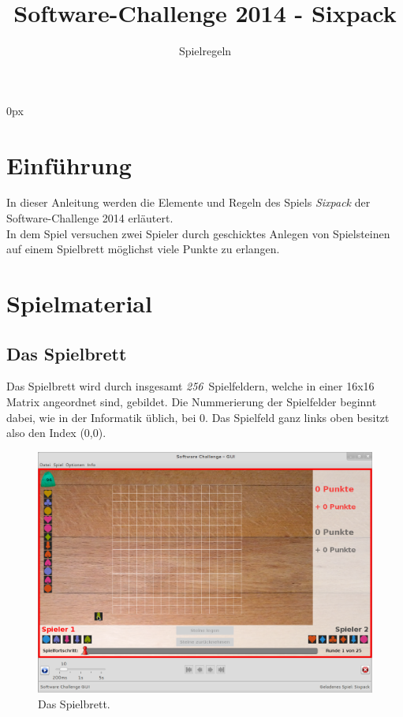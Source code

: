 \documentclass[a4paper, ngerman]{scrartcl}
\title{Software-Challenge 2014 - Sixpack}
\subtitle{Spielregeln}
\newcommand{\SpielFelderAnzahl}{\emph{256}}
\begin{document}
\parindent0px
\maketitle

\begin{figure}[h]
	\centering
\end{figure}
\vspace*{\fill}

\newpage
\tableofcontents
\newpage

\section{Einführung}
In dieser Anleitung werden die Elemente und Regeln des Spiels \emph{Sixpack}
der Software-Challenge 2014 erläutert.\\
In dem Spiel versuchen zwei Spieler durch geschicktes Anlegen von Spielsteinen auf einem Spielbrett möglichst viele Punkte zu erlangen.

\section{Spielmaterial}
	\subsection{Das Spielbrett}
Das Spielbrett wird durch insgesamt \SpielFelderAnzahl\ Spielfeldern, welche in einer 16x16 Matrix angeordnet sind, gebildet. Die Nummerierung der Spielfelder beginnt dabei, wie in der Informatik üblich, bei 0. Das Spielfeld ganz links oben besitzt also den Index (0,0).\\

\begin{figure}[h] \centering 
	\includegraphics[scale = 0.3]{images/Spielbrett}
	\caption{Das Spielbrett.}
	\label{fig:Spielfeld}
\end{figure}
\end{document}
